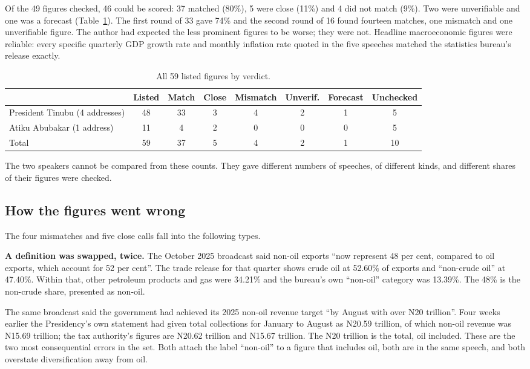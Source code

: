 \documentclass[11pt]{article}
\newcommand{\N}{N}
\begin{document}
Of the 49 figures checked, 46 could be scored: 37 matched (80\%), 5 were close (11\%) and 4 did not match (9\%). Two were unverifiable and one was a forecast (Table~\ref{tab:verdicts}). The first round of 33 gave 74\% and the second round of 16 found fourteen matches, one mismatch and one unverifiable figure. The author had expected the less prominent figures to be worse; they were not. Headline macroeconomic figures were reliable: every specific quarterly GDP growth rate and monthly inflation rate quoted in the five speeches matched the statistics bureau's release exactly.

\begin{table}[h]
\centering
\small
\setlength{\tabcolsep}{4pt}
\begin{tabular}{lccccccc}
\toprule
 & Listed & Match & Close & Mismatch & Unverif. & Forecast & Unchecked \\
\midrule
President Tinubu (4 addresses) & 48 & 33 & 3 & 4 & 2 & 1 & 5 \\
Atiku Abubakar (1 address) & 11 & 4 & 2 & 0 & 0 & 0 & 5 \\
\midrule
Total & 59 & 37 & 5 & 4 & 2 & 1 & 10 \\
\bottomrule
\end{tabular}
\caption{All 59 listed figures by verdict.}
\label{tab:verdicts}
\end{table}

The two speakers cannot be compared from these counts. They gave different numbers of speeches, of different kinds, and different shares of their figures were checked.

\subsection{How the figures went wrong}
\label{sec:wrong}

The four mismatches and five close calls fall into the following types.

\textbf{A definition was swapped, twice.} The October 2025 broadcast said non-oil exports ``now represent 48 per cent, compared to oil exports, which account for 52 per cent''. The trade release for that quarter shows crude oil at 52.60\% of exports and ``non-crude oil'' at 47.40\%. Within that, other petroleum products and gas were 34.21\% and the bureau's own ``non-oil'' category was 13.39\%. The 48\% is the non-crude share, presented as non-oil.

The same broadcast said the government had achieved its 2025 non-oil revenue target ``by August with over \N 20 trillion''. Four weeks earlier the Presidency's own statement had given total collections for January to August as \N 20.59 trillion, of which non-oil revenue was \N 15.69 trillion; the tax authority's figures are \N 20.62 trillion and \N 15.67 trillion. The \N 20 trillion is the total, oil included. These are the two most consequential errors in the set. Both attach the label ``non-oil'' to a figure that includes oil, both are in the same speech, and both overstate diversification away from oil.
\end{document}
